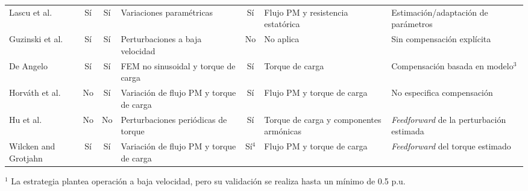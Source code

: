 \begin{table}[htbp]
\begin{adjustbox}{max width=\textwidth}
\begin{tabular}{
        l
        c
        c
        l
        c
        l
        l
    }
        Lascu et al.
        \cite{lascuPLLPositionSpeed2020}
        & Sí
        & Sí
        & Variaciones paramétricas
        & Sí
        & Flujo PM y resistencia estatórica
        & Estimación/adaptación de parámetros
        \\
        
        Guzinski et al.
        \cite{guzinskiSensorlessLowSpeed2019}
        & Sí
        & Sí
        & Perturbaciones a baja velocidad
        & No
        & No aplica
        & Sin compensación explícita
        \\
        
        De Angelo
        \cite{deangeloControlParaMaquinas2004}
        & Sí
        & Sí
        & FEM no sinusoidal y torque de carga
        & Sí
        & Torque de carga
        & Compensación basada en modelo$^{3}$
        \\
        
        Horváth et al.
        \cite{horvathLoadTorquePermanent2023}
        & No
        & Sí
        & Variación de flujo PM y torque de carga
        & Sí
        & Flujo PM y torque de carga
        & No especifica compensación
        \\
        
        Hu et al.
        \cite{huSelectivePeriodicDisturbance2022}
        & No
        & No
        & Perturbaciones periódicas de torque
        & Sí
        & Torque de carga y componentes armónicas
        & \textit{Feedforward} de la perturbación estimada
        \\
        
        Wilcken and Grotjahn
        \cite{wilckenRotorPositionEstimation2023}
        & Sí
        & Sí
        & Variación de flujo PM y torque de carga
        & Sí$^{4}$
        & Flujo PM y torque de carga
        & \textit{Feedforward} del torque estimado
        \\
        
        \bottomrule
    \end{tabular}
    \end{adjustbox}
    
    \vspace{2mm}
    
    \begin{minipage}{0.95\textwidth}
    \scriptsize
    \setlength{\parindent}{0pt}
    \setlength{\parskip}{1pt}
        
        $^{1}$ La estrategia plantea operación a baja velocidad, pero su validación se realiza hasta un mínimo de 0.5 p.u.
        

\end{minipage}
\end{table}

